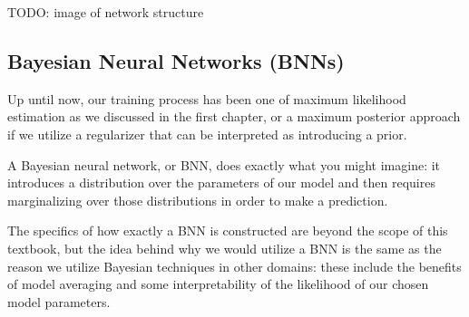 TODO: image of network structure

\subsection{Bayesian Neural Networks (BNNs)}
Up until now, our training process has been one of maximum likelihood estimation as we discussed in the first chapter, or a maximum posterior approach if we utilize a regularizer that can be interpreted as introducing a prior.

A Bayesian neural network, or BNN, does exactly what you might imagine: it introduces a distribution over the parameters of our model and then requires marginalizing over those distributions in order to make a prediction.

The specifics of how exactly a BNN is constructed are beyond the scope of this textbook, but the idea behind why we would utilize a BNN is the same as the reason we utilize Bayesian techniques in other domains: these include the benefits of model averaging and some interpretability of the likelihood of our chosen model parameters.